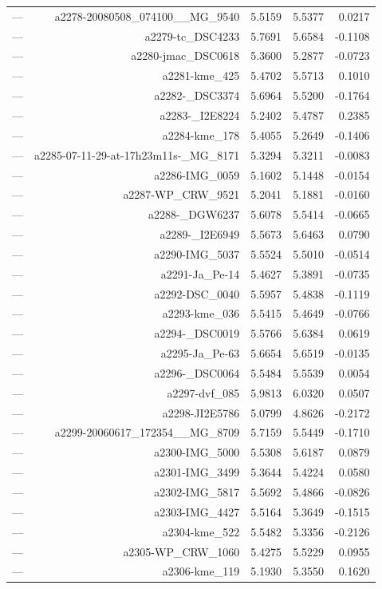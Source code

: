 \begin{table}[htbp]
\begin{tabular}{lrrrr}
— & a2278-20080508_074100__MG_9540 & 5.5159 & 5.5377 & 0.0217 \\
— & a2279-tc_DSC4233 & 5.7691 & 5.6584 & -0.1108 \\
— & a2280-jmac_DSC0618 & 5.3600 & 5.2877 & -0.0723 \\
— & a2281-kme_425 & 5.4702 & 5.5713 & 0.1010 \\
— & a2282-_DSC3374 & 5.6964 & 5.5200 & -0.1764 \\
— & a2283-_I2E8224 & 5.2402 & 5.4787 & 0.2385 \\
— & a2284-kme_178 & 5.4055 & 5.2649 & -0.1406 \\
— & a2285-07-11-29-at-17h23m11s-_MG_8171 & 5.3294 & 5.3211 & -0.0083 \\
— & a2286-IMG_0059 & 5.1602 & 5.1448 & -0.0154 \\
— & a2287-WP_CRW_9521 & 5.2041 & 5.1881 & -0.0160 \\
— & a2288-_DGW6237 & 5.6078 & 5.5414 & -0.0665 \\
— & a2289-_I2E6949 & 5.5673 & 5.6463 & 0.0790 \\
— & a2290-IMG_5037 & 5.5524 & 5.5010 & -0.0514 \\
— & a2291-Ja_Pe-14 & 5.4627 & 5.3891 & -0.0735 \\
— & a2292-DSC_0040 & 5.5957 & 5.4838 & -0.1119 \\
— & a2293-kme_036 & 5.5415 & 5.4649 & -0.0766 \\
— & a2294-_DSC0019 & 5.5766 & 5.6384 & 0.0619 \\
— & a2295-Ja_Pe-63 & 5.6654 & 5.6519 & -0.0135 \\
— & a2296-_DSC0064 & 5.5484 & 5.5539 & 0.0054 \\
— & a2297-dvf_085 & 5.9813 & 6.0320 & 0.0507 \\
— & a2298-JI2E5786 & 5.0799 & 4.8626 & -0.2172 \\
— & a2299-20060617_172354__MG_8709 & 5.7159 & 5.5449 & -0.1710 \\
— & a2300-IMG_5000 & 5.5308 & 5.6187 & 0.0879 \\
— & a2301-IMG_3499 & 5.3644 & 5.4224 & 0.0580 \\
— & a2302-IMG_5817 & 5.5692 & 5.4866 & -0.0826 \\
— & a2303-IMG_4427 & 5.5164 & 5.3649 & -0.1515 \\
— & a2304-kme_522 & 5.5482 & 5.3356 & -0.2126 \\
— & a2305-WP_CRW_1060 & 5.4275 & 5.5229 & 0.0955 \\
— & a2306-kme_119 & 5.1930 & 5.3550 & 0.1620 \\

\end{tabular}
\end{table}
